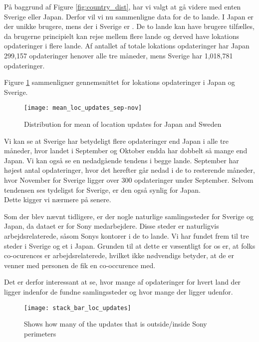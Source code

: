 På baggrund af Figure \ref{fig:country_dist}, har vi valgt at gå videre med enten Sverige eller Japan. Derfor vil vi nu sammenligne data for de to lande. 
I Japan er der \numberUsersJapan{} unikke brugere, mens der i Sverige er \numberUsersSweden. De to lande kan have brugere tilfælles, da brugerne principielt kan rejse mellem flere lande og derved have lokations opdateringer i flere lande.  
Af antallet af totale lokations opdateringer har Japan 299,157 opdateringer henover alle tre måneder, mens Sverige har 1,018,781 opdateringer.

Figure \ref{fig:mean_loc_updates_sep-nov} sammenligner gennemsnittet for lokations opdateringer i Japan og Sverige.
\begin{figure}[H]
    \hspace*{-2.2cm}
    \centering
    \texttt{[image: mean\_loc\_updates\_sep-nov]}
    \caption{Distribution for mean of location updates for Japan and Sweden}
    \label{fig:mean_loc_updates_sep-nov}
\end{figure}

Vi kan se at Sverige har betydeligt flere opdateringer end Japan i alle tre måneder, hvor landet i September og Oktober endda har dobbelt så mange end Japan. Vi kan også se en nedadgående tendens i begge lande. September har højest antal opdateringer, hvor det herefter går nedad i de to resterende måneder, hvor November for Sverige ligger over 300 opdateringer under September. Selvom tendensen ses tydeligst for Sverige, er den også synlig for Japan. \\
Dette kigger vi nærmere på senere.

Som der blev nævnt tidligere, er der nogle naturlige samlingssteder for Sverige og Japan, da dataet er for Sony medarbejdere. Disse steder er naturligvis arbejdsrelaterede, såsom Sonys kontorer i de to lande. Vi har fundet frem til tre steder i Sverige og et i Japan. Grunden til at dette er væsentligt for os er, at folks co-ocurences er arbejdsrelaterede, hvilket ikke nødvendigs betyder, at de er venner med personen de fik en co-occurence med.

Det er derfor interessant at se, hvor mange af opdateringer for hvert land der ligger indenfor de fundne samlingssteder og hvor mange der ligger udenfor. 

\begin{figure}[H]
    \hspace*{-2.2cm}
    \centering
    \texttt{[image: stack\_bar\_loc\_updates]}
    \caption{Shows how many of the updates that is outside/inside Sony perimeters}
    \label{fig:hq_stack_bar}
\end{figure}

